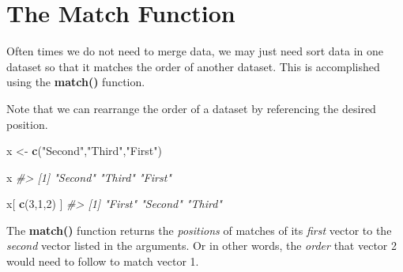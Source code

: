\documentclass[]{book}
\newenvironment{Shaded}{\begin{snugshade}}{\end{snugshade}}
\newcommand{\CommentTok}[1]{\textcolor[rgb]{0.56,0.35,0.01}{\textit{#1}}}
\newcommand{\DecValTok}[1]{\textcolor[rgb]{0.00,0.00,0.81}{#1}}
\newcommand{\KeywordTok}[1]{\textcolor[rgb]{0.13,0.29,0.53}{\textbf{#1}}}
\newcommand{\NormalTok}[1]{#1}
\newcommand{\OperatorTok}[1]{\textcolor[rgb]{0.81,0.36,0.00}{\textbf{#1}}}
\newcommand{\StringTok}[1]{\textcolor[rgb]{0.31,0.60,0.02}{#1}}
\theoremstyle{definition}
\theoremstyle{definition}
\theoremstyle{definition}
\theoremstyle{remark}
\begin{document}
\begin{Shaded}
\end{Shaded}

\hypertarget{the-match-function}{%
\section{The Match Function}\label{the-match-function}}

Often times we do not need to merge data, we may just need sort data in
one dataset so that it matches the order of another dataset. This is
accomplished using the \textbf{match()} function.

Note that we can rearrange the order of a dataset by referencing the
desired position.

\begin{Shaded}
\begin{Highlighting}[]

\NormalTok{x <-}\StringTok{ }\KeywordTok{c}\NormalTok{(}\StringTok{"Second"}\NormalTok{,}\StringTok{"Third"}\NormalTok{,}\StringTok{"First"}\NormalTok{)}

\NormalTok{x}
\CommentTok{#> [1] "Second" "Third"  "First"}

\NormalTok{x[ }\KeywordTok{c}\NormalTok{(}\DecValTok{3}\NormalTok{,}\DecValTok{1}\NormalTok{,}\DecValTok{2}\NormalTok{) ]}
\CommentTok{#> [1] "First"  "Second" "Third"}
\end{Highlighting}
\end{Shaded}

The \textbf{match()} function returns the \emph{positions} of matches of
its \emph{first} vector to the \emph{second} vector listed in the
arguments. Or in other words, the \emph{order} that vector 2 would need
to follow to match vector 1.
\end{document}
